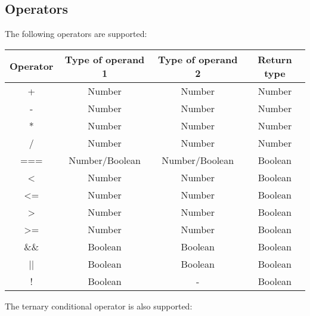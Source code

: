 \subsection{Operators}
The following operators are supported: 
\begin{center}
  \begin{tabular}{|c | c | c | c|} 
   \hline
   Operator & Type of operand 1 & Type of operand 2 & Return type \\ 
   \hline\hline
   + & Number & Number & Number \\ 
   \hline
   - & Number & Number & Number \\ 
   \hline
   * & Number & Number & Number \\ 
   \hline
   / & Number & Number & Number \\ 
   \hline
   === & Number/Boolean & Number/Boolean & Boolean \\ 
   \hline
   < & Number & Number & Boolean \\ 
   \hline
   <= & Number & Number & Boolean \\ 
   \hline
   > & Number & Number & Boolean \\ 
   \hline
   >= & Number & Number & Boolean \\ 
   \hline
   \&\& & Boolean & Boolean & Boolean \\ 
   \hline
   || & Boolean & Boolean & Boolean \\ 
   \hline
   ! & Boolean & - & Boolean \\ 
   \hline
  \end{tabular}
\end{center}
The ternary conditional operator is also supported: \\

